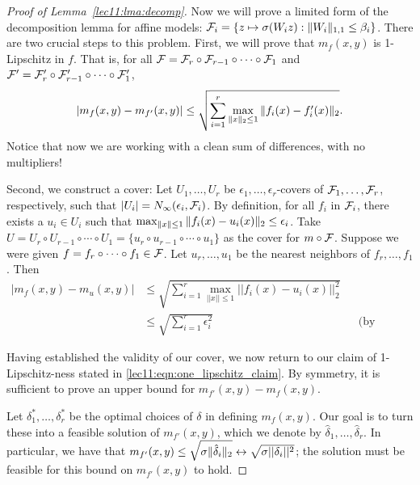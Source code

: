 \begin{proof}[Proof of Lemma~\ref{lec11:lma:decomp}]
Now we will prove a limited form of the decomposition lemma for affine models: $\mathcal F_i = \{ z \mapsto \sigma(W_i z): \|W_i\|_{1, 1} \leq \beta_i \}$. There are two crucial steps to this problem. First, we will prove that $m_f(x, y)$ is 1-Lipschitz in $f$. That is, for all $\mathcal F = \mathcal F_r \circ \mathcal F_{r-1} \circ \cdots \circ \mathcal F_1$ and $\mathcal F' = \mathcal F_r' \circ 
\mathcal F_{r-1}' \circ \cdots \circ \mathcal F_1'$,
\begin{align}
    \left\lvert m_f(x, y) - m_{f'}(x, y)\right\rvert \leq \sqrt{\sum_{i=1}^r \max_{\|x\|_2 \leq 1} \|f_i(x) - f_i'(x)\|_2}. \label{lec11:eqn:one_lipschitz_claim}
\end{align}
Notice that now we are working with a clean sum of differences, with no multipliers! 

Second, we construct a cover: Let $U_1, \dots, U_r$ be $\epsilon_1, \dots, \epsilon_r$-covers of $\mathcal F_1, \dots, \mathcal F_r$, respectively, such that $\left\lvert U_i\right\rvert = N_\infty(\epsilon_i, \mathcal F_i)$. By definition, for all $f_i$ in $\mathcal F_i$, there exists a $u_i \in U_i$ such that $\max_{\|x\| \leq 1} \|f_i(x) - u_i(x)\|_2 \leq \epsilon_i$. Take $U = U_r \circ U_{r-1} \circ \cdots \circ U_1 = \{u_r \circ u_{r-1} \circ \cdots \circ u_1 \}$ as the cover for $m \circ \mathcal F$. Suppose we were given $f = f_r \circ \cdots \circ f_1 \in \mathcal F$. Let $u_r, \dots, u_1$ be the nearest neighbors of $f_r, \dots, f_1$. Then
\begin{align}
|m_f(x, y) - m_u(x, y)| &\leq \sqrt{\sum_{i=1}^r \max_{||x|| \leq 1} ||f_i(x) - u_i(x)||_2^2} \\
&\leq \sqrt{\sum_{i=1}^r \epsilon_i^2} &&\text{(by construction).}
\end{align}

Having established the validity of our cover, we now return to our claim of 1-Lipschitz-ness stated in \eqref{lec11:eqn:one_lipschitz_claim}. By symmetry, it is sufficient to prove an upper bound for $m_{f'}(x, y) - m_f(x, y)$.

Let $\delta_1^*, \dots, \delta_r^*$ be the optimal choices of $\delta$ in defining $m_f(x, y)$. Our goal is to turn these into a feasible solution of $m_{f'}(x, y)$, which we denote by $\hat{\delta}_1, \dots, \hat{\delta}_r$. In particular, we have that $m_{f'}(x, y) \leq \sqrt{\sigma \|\hat{\delta}_i\|_2} \leftrightarrow \sqrt{\sigma||\delta_i||^2}$; the solution must be feasible for this bound on $m_{f'}(x, y)$ to hold.


\end{proof}
